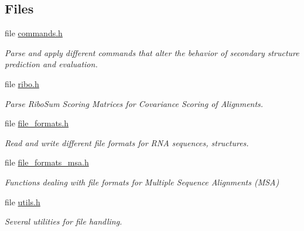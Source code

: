 \subsection*{Files}
\begin{DoxyCompactItemize}
\item 
file \mbox{\hyperlink{commands_8h}{commands.\+h}}
\begin{DoxyCompactList}\small\item\em Parse and apply different commands that alter the behavior of secondary structure prediction and evaluation. \end{DoxyCompactList}\item 
file \mbox{\hyperlink{ribo_8h}{ribo.\+h}}
\begin{DoxyCompactList}\small\item\em Parse Ribo\+Sum Scoring Matrices for Covariance Scoring of Alignments. \end{DoxyCompactList}\item 
file \mbox{\hyperlink{io_2file__formats_8h}{file\+\_\+formats.\+h}}
\begin{DoxyCompactList}\small\item\em Read and write different file formats for R\+NA sequences, structures. \end{DoxyCompactList}\item 
file \mbox{\hyperlink{io_2file__formats__msa_8h}{file\+\_\+formats\+\_\+msa.\+h}}
\begin{DoxyCompactList}\small\item\em Functions dealing with file formats for Multiple Sequence Alignments (M\+SA) \end{DoxyCompactList}\item 
file \mbox{\hyperlink{io_2utils_8h}{utils.\+h}}
\begin{DoxyCompactList}\small\item\em Several utilities for file handling. \end{DoxyCompactList}\end{DoxyCompactItemize}

